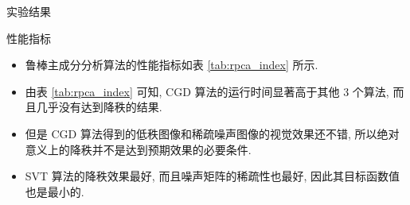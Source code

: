 \documentclass{beamer}
\begin{document}
\begin{frame}{实验结果}
  \begin{block}{性能指标}
    \begin{itemize}
      \item 鲁棒主成分分析算法的性能指标如表 \ref{tab:rpca_index} 所示. 
      \item 由表 \ref{tab:rpca_index} 可知, CGD 算法的运行时间显著高于其他 3 个算法, 而且几乎没有达到降秩的结果.
      \item 但是 CGD 算法得到的低秩图像和稀疏噪声图像的视觉效果还不错, 所以绝对意义上的降秩并不是达到预期效果的必要条件.
      \item SVT 算法的降秩效果最好, 而且噪声矩阵的稀疏性也最好, 因此其目标函数值也是最小的.
    \end{itemize}
  \end{block}
\end{frame}
\end{document}
